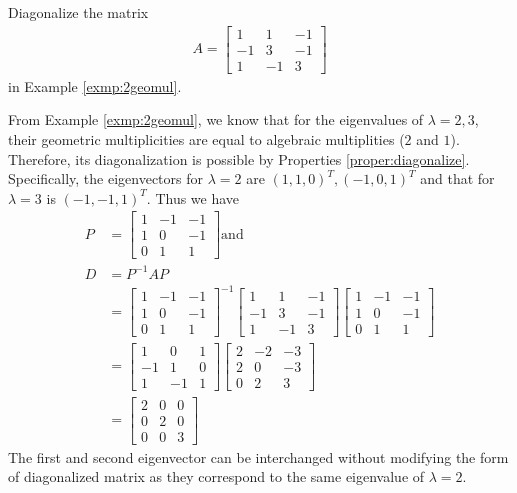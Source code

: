 \begin{exmp}
Diagonalize the matrix 
\begin{align*}
A = \begin{bmatrix}
1 & 1 & -1 \\
-1 & 3 & -1 \\
1 & -1 & 3
\end{bmatrix}
\end{align*}
in Example \ref{exmp:2geomul}.
\end{exmp}
\begin{solution}
From Example \ref{exmp:2geomul}, we know that for the eigenvalues of $\lambda = 2,3$, their geometric multiplicities are equal to algebraic multiplities ($2$ and $1$). Therefore, its diagonalization is possible by Properties \ref{proper:diagonalize}. Specifically, the eigenvectors for $\lambda = 2$ are $(1,1,0)^T, (-1,0,1)^T$ and that for $\lambda = 3$ is $(-1,-1,1)^T$. Thus we have
\begin{align*}
P &= 
\begin{bmatrix}
1 & -1 & -1 \\
1 & 0 & -1 \\
0 & 1 & 1
\end{bmatrix}
\text{and } \\
D &= P^{-1}AP \\
&= \begin{bmatrix}
1 & -1 & -1 \\
1 & 0 & -1 \\
0 & 1 & 1
\end{bmatrix}^{-1}
\begin{bmatrix}
1 & 1 & -1 \\
-1 & 3 & -1 \\
1 & -1 & 3
\end{bmatrix}
 \begin{bmatrix}
1 & -1 & -1 \\
1 & 0 & -1 \\
0 & 1 & 1
\end{bmatrix} \\
&= 
\begin{bmatrix}
1 & 0 & 1 \\
-1 & 1 & 0 \\
1 & -1 & 1
\end{bmatrix}
\begin{bmatrix}
2 & -2 & -3 \\
2 & 0 & -3 \\
0 & 2 & 3
\end{bmatrix} \\
&= 
\begin{bmatrix}
2 & 0 & 0 \\
0 & 2 & 0 \\
0 & 0 & 3
\end{bmatrix}
\end{align*}
The first and second eigenvector can be interchanged without modifying the form of diagonalized matrix as they correspond to the same eigenvalue of $\lambda = 2$.
\end{solution}

